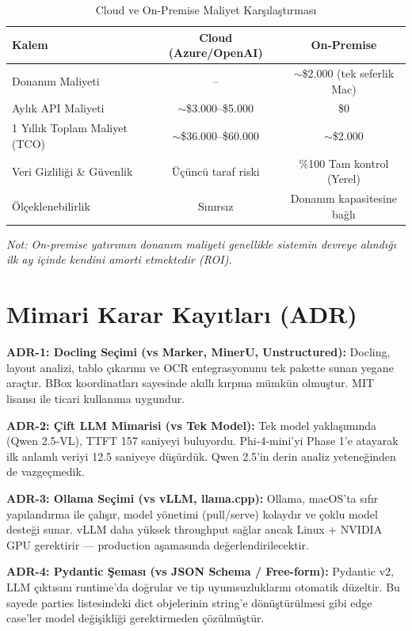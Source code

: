 \documentclass[11pt,a4paper]{article}
\begin{document}
\begin{table}[H]
\centering
\caption{Cloud ve On-Premise Maliyet Karşılaştırması}
\begin{tabular}{lcc}
\toprule
Kalem & Cloud (Azure/OpenAI) & On-Premise \\
\midrule
Donanım Maliyeti & -- & $\sim$\$2.000 (tek seferlik Mac) \\
Aylık API Maliyeti & $\sim$\$3.000--\$5.000 & \$0 \\
1 Yıllık Toplam Maliyet (TCO) & $\sim$\$36.000--\$60.000 & $\sim$\$2.000 \\
Veri Gizliliği \& Güvenlik & Üçüncü taraf riski & \%100 Tam kontrol (Yerel) \\
Ölçeklenebilirlik & Sınırsız & Donanım kapasitesine bağlı \\
\bottomrule
\end{tabular}
\end{table}
\textit{Not: On-premise yatırımın donanım maliyeti genellikle sistemin devreye alındığı ilk ay içinde kendini amorti etmektedir (ROI).}

\section{Mimari Karar Kayıtları (ADR)}

\noindent \textbf{ADR-1: Docling Seçimi (vs Marker, MinerU, Unstructured):} Docling, layout analizi, tablo çıkarımı ve OCR entegrasyonunu tek pakette sunan yegane araçtır. BBox koordinatları sayesinde akıllı kırpma mümkün olmuştur. MIT lisansı ile ticari kullanıma uygundur.

\vspace{6pt}
\noindent \textbf{ADR-2: Çift LLM Mimarisi (vs Tek Model):} Tek model yaklaşımında (Qwen 2.5-VL), TTFT 157 saniyeyi buluyordu. Phi-4-mini'yi Phase 1'e atayarak ilk anlamlı veriyi 12.5 saniyeye düşürdük. Qwen 2.5'in derin analiz yeteneğinden de vazgeçmedik.

\vspace{6pt}
\noindent \textbf{ADR-3: Ollama Seçimi (vs vLLM, llama.cpp):} Ollama, macOS'ta sıfır yapılandırma ile çalışır, model yönetimi (pull/serve) kolaydır ve çoklu model desteği sunar. vLLM daha yüksek throughput sağlar ancak Linux + NVIDIA GPU gerektirir — production aşamasında değerlendirilecektir.

\vspace{6pt}
\noindent \textbf{ADR-4: Pydantic Şeması (vs JSON Schema / Free-form):} Pydantic v2, LLM çıktısını runtime'da doğrular ve tip uyumsuzluklarını otomatik düzeltir. Bu sayede parties listesindeki dict objelerinin string'e dönüştürülmesi gibi edge case'ler model değişikliği gerektirmeden çözülmüştür.
\end{document}
